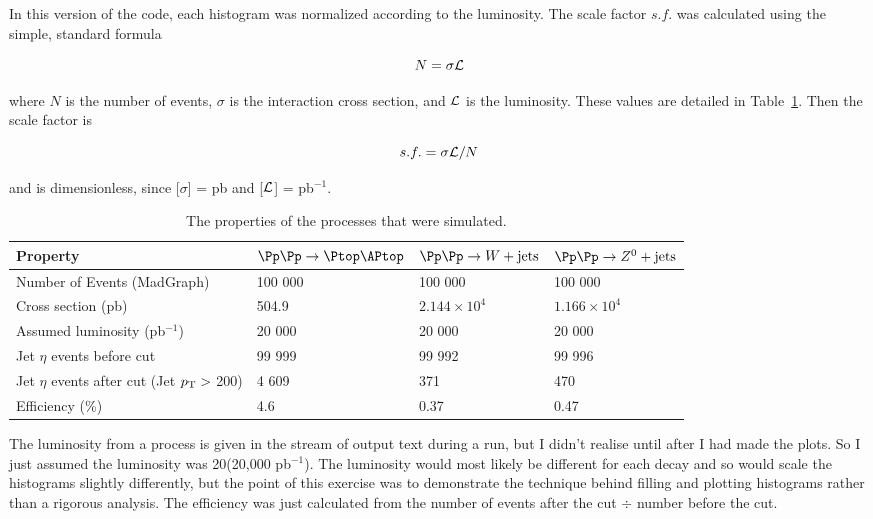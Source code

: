 In this version of the code, each histogram was normalized according to the luminosity. The scale factor $s.f.$ was calculated using the simple, standard formula

\begin{equation}
\label{eq:lumiexpev}
N = \sigma \mathcal{L}
\end{equation}

where $N$ is the number of events, $\sigma$ is the interaction cross section, and $\mathcal{L}$ is the luminosity. These values are detailed in Table~\ref{tab:comparison}. Then the scale factor is

\begin{equation}
s.f. = \sigma \mathcal{L} / N
\end{equation}

and is dimensionless, since [$\sigma$] = pb and [$\mathcal{L}$] = pb$^{-1}$.

\begin{table}[H]
\centering
    \begin{tabular}{|l|l|l|l|}
    \hline
    Property                                & $\Pp\Pp \rightarrow \ttbar$ & $\Pp\Pp \rightarrow W + \mathrm{jets}$ & $\Pp\Pp \rightarrow Z^0 + \mathrm{jets}$ \\ \hline
    Number of Events (MadGraph)             & 100 000 & 100 000 & 100 000 \\
    Cross section (pb)                      & 504.9   & $2.144\times10^4$ & $1.166\times10^4$ \\
    Assumed luminosity (pb$^{-1}$)		& 20 000	& 20 000 & 20 000 \\
    Jet $\eta$ events before cut               & 99 999  & 99 992  & 99 996  \\
    Jet $\eta$  events after cut (Jet $p_{\mathrm{T}} >$ 200) & 4 609    & 371     & 470     \\
    Efficiency (\%)                         & 4.6     & 0.37    & 0.47    \\ \hline
    \end{tabular}
\caption{The properties of the \madgraph processes that were simulated.}
\label{tab:comparison}
\end{table}

The luminosity from a process is given in the stream of output text during a \madgraph run, but I didn't realise until after I had made the plots. So I just assumed the luminosity was 20\fbinv (20,000 pb$^{-1}$). The luminosity would most likely be different for each decay and so would scale the histograms slightly differently, but the point of this exercise was to demonstrate the technique behind filling and plotting histograms rather than a rigorous analysis. The efficiency was just calculated from the number of events after the cut $\div$ number before the cut.

